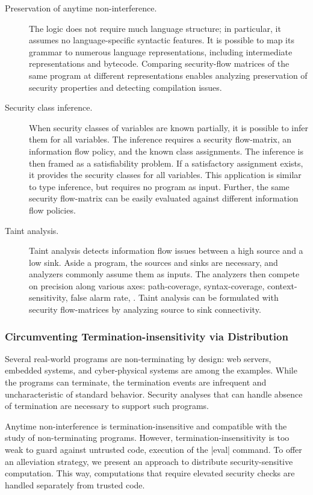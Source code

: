 \begin{description}
\item[Preservation of anytime non-interference.] The \lname logic does not
require much language structure; in particular, it assumes no language-specific
syntactic features. It is possible to map its grammar to numerous language
representations, including intermediate representations and bytecode. Comparing
security-flow matrices of the same program at different representations enables
analyzing preservation of security properties and detecting compilation issues.

\item[Security class inference.]
When security classes of variables are known partially, it is possible to infer
them for all variables. The inference requires a security flow-matrix, an
information flow policy, and the known class assignments. The inference is then
framed as a satisfiability problem. If a satisfactory assignment exists, it
provides the security classes for all variables. This application is similar to
type inference, but requires no program as input. Further, the same security
flow-matrix can be easily evaluated against different information flow policies.

\item[Taint analysis.]
Taint analysis detects information flow issues between a high source and a low
sink. Aside a program, the sources and sinks are necessary, and analyzers
commonly assume them as inputs. The analyzers then compete on precision along
various axes: path-coverage, syntax-coverage, context-sensitivity, false alarm
rate, \etc. Taint analysis can be formulated with security flow-matrices by
analyzing source to sink connectivity.
\end{description}

\subsubsection{Circumventing Termination-insensitivity via Distribution}
\label{subsub:termination}

Several real-world programs are non-terminating by design: web servers, embedded
systems, and cyber-physical systems are among the examples. While the programs
can terminate, the termination events are infrequent and uncharacteristic of
standard behavior. Security analyses that can handle absence of termination are
necessary to support such programs.

Anytime non-interference is termination-insensitive and compatible with the
study of non-terminating programs. However, termination-insensitivity is too
weak to guard against untrusted code, \eg execution of the \prc|eval| command.
To offer an alleviation strategy, we present an approach to distribute
security-sensitive computation. This way, computations that require elevated
security checks are handled separately from trusted code.

